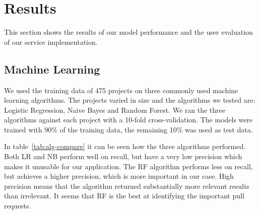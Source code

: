 \section{Results}
\label{sec:results}

This section shows the results of our model performance and the user evaluation of our service implementation.

\subsection{Machine Learning}
\label{sec:learning}

We used the training data of 475 projects on three commonly used machine learning algorithms.
The projects varied in size and the algorithms we tested are: Logistic Regression, Naive Bayes and Random Forest.
We ran the three algorithms against each project with a 10-fold cross-validation.
The models were trained with 90\% of the training data, the remaining 10\% was used as test data.

In table~\ref{tab:alg-compare} it can be seen how the three algorithms performed.
Both LR and NB perform well on recall, but have a very low precision which makes it unusable for our application.
The RF algorithm performs less on recall, but achieves a higher precision, which is more important in our case.
High precision means that the algorithm returned substantially more relevant results than irrelevant.
It seems that RF is the best at identifying the important pull requests.

